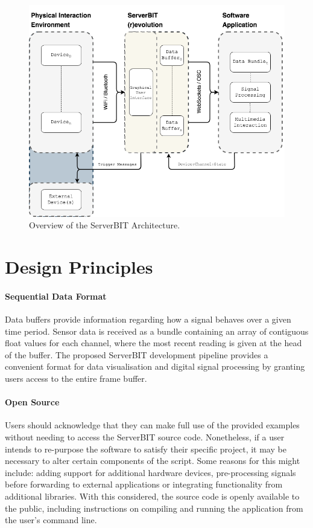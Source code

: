 \begin{figure}[ht]
  \centering
    \includegraphics[width=\textwidth]{Chapters/Figures/technical/ServerBIT/ServerBIT_Archietecture_EXT.png}
    \caption{Overview of the ServerBIT Architecture.}
    \label{fig:diagram1}
\end{figure}

\section{Design Principles}

\paragraph{Sequential Data Format}
Data buffers provide information regarding how a signal behaves over a given time period. Sensor data is received as a bundle containing an array of contiguous float values for each channel, where the most recent reading is given at the head of the buffer. The proposed ServerBIT development pipeline provides a convenient format for data visualisation and digital signal processing by granting users access to the entire frame buffer.

\paragraph{Open Source}
Users should acknowledge that they can make full use of the provided examples without needing to access the ServerBIT source code. Nonetheless, if a user intends to re-purpose the software to satisfy their specific project, it may be necessary to alter certain components of the script. Some reasons for this might include: adding support for additional hardware devices, pre-processing signals before forwarding to external applications or integrating functionality from additional libraries. With this considered, the source code is openly available to the public, including instructions on compiling and running the application from the user's command line.

